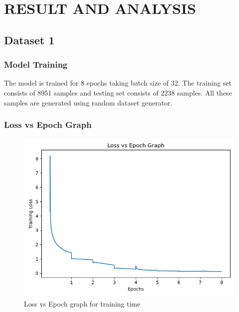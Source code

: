 \section{\MakeUppercase{Result and Analysis}}
\subsection{Dataset 1}
\subsubsection{Model Training}
The model is trained for 8 epochs taking batch size of 32. The training set consists of
8951 samples and testing set consists of 2238 samples. All these samples are generated
using random dataset generator.
\subsubsection{Loss vs Epoch Graph}
 \begin{figure}[H]
        \includegraphics[scale=0.6]{images/Training Loss.png}
        \centering
        \caption{Loss vs Epoch graph for training time}
        \label{fig:lvsepoct}
    \end{figure}
